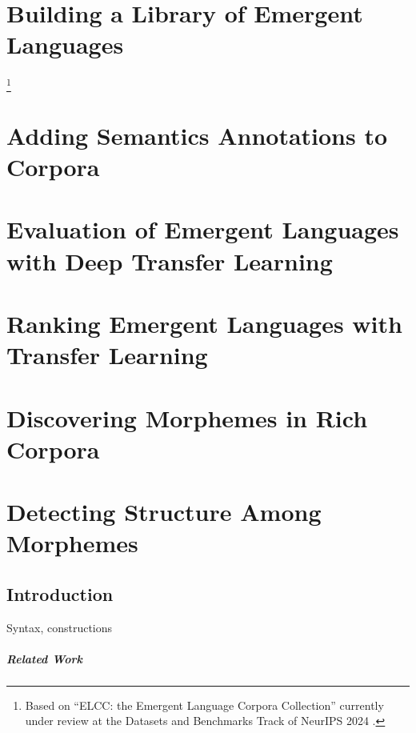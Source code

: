 \newpage
\tableofcontents*



\chapter{Building a Library of Emergent Languages }

\footnote{Based on ``ELCC: the Emergent Language Corpora Collection'' currently under review at the Datasets and Benchmarks Track of NeurIPS 2024 .}


\chapter{Adding Semantics Annotations to Corpora }
\unskip\label{ch:rich-corpora}


\chapter{Evaluation of Emergent Languages with Deep Transfer Learning}



\chapter{Ranking Emergent Languages with Transfer Learning }
\unskip\label{ch:xferbench-analysis}



\chapter{Discovering Morphemes in Rich Corpora }
\unskip\label{ch:universals}



\chapter{Detecting Structure Among Morphemes }
\unskip\label{ch:syntax}

\section{Introduction}

Syntax, constructions

\paragraph{Related Work}

